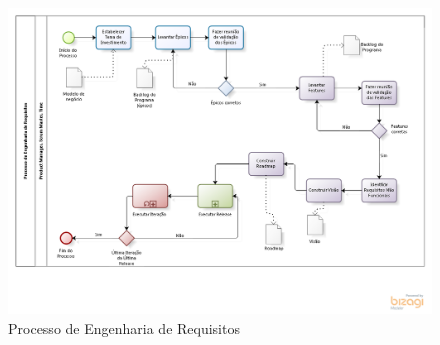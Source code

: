 \pagebreak
\begin{figure}[!htb]
\centering

\includegraphics[scale=0.8, angle = -90]{figuras/processo.png}
\caption{Processo de Engenharia de Requisitos}
\label{fig:Processo}
\end{figure}



